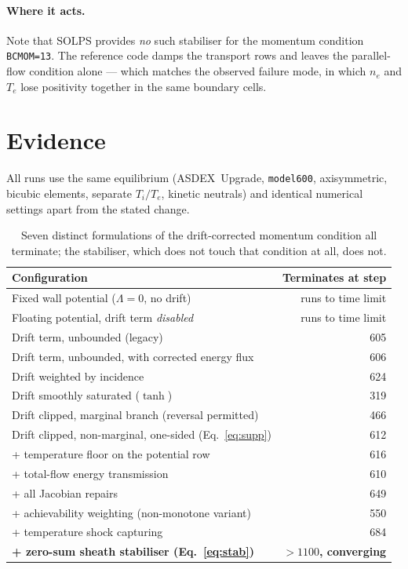 \documentclass[11pt,a4paper]{article}
\newcommand{\code}[1]{\texttt{\small #1}}
\begin{document}
\paragraph{Where it acts.} Note that SOLPS provides \emph{no} such stabiliser for the momentum
condition \code{BCMOM=13}. The reference code damps the transport rows and leaves the parallel-flow
condition alone --- which matches the observed failure mode, in which $n_e$ and $T_e$ lose
positivity together in the same boundary cells.

\section{Evidence}\label{sec:evidence}

All runs use the same equilibrium (ASDEX~Upgrade, \code{model600}, axisymmetric, bicubic elements,
separate $T_i/T_e$, kinetic neutrals) and identical numerical settings apart from the stated change.

\begin{table}[h]\centering
\begin{tabular}{lr}
\toprule
Configuration & Terminates at step \\
\midrule
Fixed wall potential ($\Lambda=0$, no drift)                 & runs to time limit \\
Floating potential, drift term \emph{disabled}                & runs to time limit \\
\midrule
Drift term, unbounded (legacy)                                & 605 \\
Drift term, unbounded, with corrected energy flux             & 606 \\
Drift weighted by incidence                                   & 624 \\
Drift smoothly saturated ($\tanh$)                            & 319 \\
Drift clipped, marginal branch (reversal permitted)           & 466 \\
Drift clipped, non-marginal, one-sided (Eq.~\ref{eq:supp})    & 612 \\
\quad + temperature floor on the potential row                & 616 \\
\quad + total-flow energy transmission                        & 610 \\
\quad + all Jacobian repairs                                  & 649 \\
\quad + achievability weighting (non-monotone variant)        & 550 \\
\quad + temperature shock capturing                           & 684 \\
\midrule
\textbf{\quad + zero-sum sheath stabiliser (Eq.~\ref{eq:stab})} & \textbf{$>1100$, converging} \\
\bottomrule
\end{tabular}
\caption{Seven distinct formulations of the drift-corrected momentum condition all terminate; the
stabiliser, which does not touch that condition at all, does not.}
\end{table}
\end{document}
